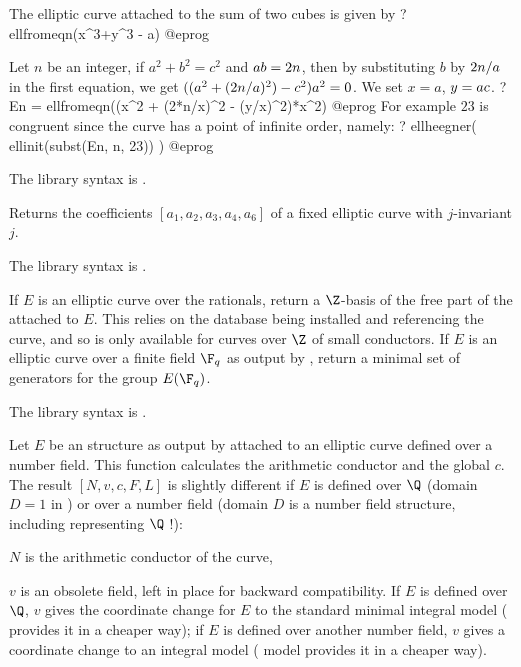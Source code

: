 The elliptic curve attached to the sum of two cubes is given by
\bprog
? ellfromeqn(x^3+y^3 - a)
@eprog

Let $n$ be an integer, if $a^2+b^2=c^2$ and $a\*b=2\*n$,
then by substituting $b$ by $2\*n/a$ in the first equation,
we get $((a^2+(2\*n/a)^2)-c^2)\*a^2 = 0$.
We set $x=a$, $y=a\*c$.
\bprog
? En = ellfromeqn((x^2 + (2*n/x)^2 - (y/x)^2)*x^2)
@eprog
For example $23$ is congruent since the curve has a point of infinite order,
namely:
\bprog
? ellheegner( ellinit(subst(En, n, 23)) )
@eprog

The library syntax is .

\label{se:ellfromj}
Returns the coefficients $[a_1,a_2,a_3,a_4,a_6]$ of a fixed elliptic curve
with $j$-invariant $j$.

The library syntax is .

\label{se:ellgenerators}
If $E$ is an elliptic curve over the rationals, return a $\Z$-basis of the
free part of the  attached to $E$.  This relies on
the  database being installed and referencing the curve, and so
is only available for curves over $\Z$ of small conductors.
If $E$ is an elliptic curve over a finite field $\F_q$ as output by
, return a minimal set of generators for the group $E(\F_q)$.

The library syntax is .

\label{se:ellglobalred}
Let $E$ be an  structure as output by  attached
to an elliptic curve defined over a number field. This function calculates
the arithmetic conductor and the global  $c$.
The result $[N,v,c,F,L]$ is slightly different if $E$ is defined
over $\Q$ (domain $D = 1$ in ) or over a number field
(domain $D$ is a number field structure, including 
representing $\Q$ !):

\item $N$ is the arithmetic conductor of the curve,

\item $v$ is an obsolete field, left in place for backward compatibility.
If $E$ is defined over $\Q$, $v$ gives the coordinate change for $E$ to the
standard minimal integral model ( provides it in a
cheaper way); if $E$ is defined over another number field, $v$ gives a
coordinate change to an integral model ( model provides it
in a cheaper way).

